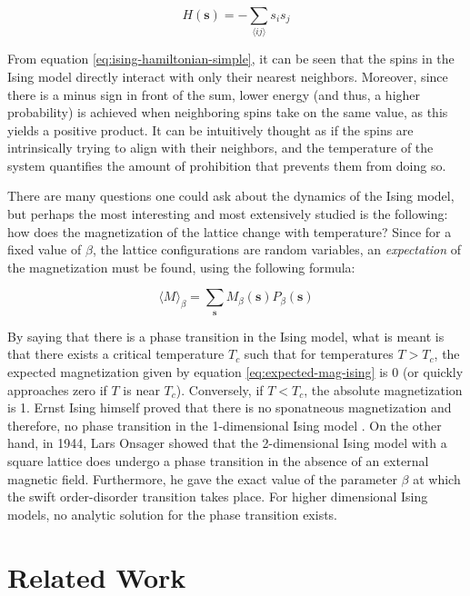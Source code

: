 \documentclass[12pt]{article}
\begin{document}
\begin{equation}
H(\boldsymbol{s}) = - \sum_{\langle ij \rangle} s_i s_j
\label{eq:ising-hamiltonian-simple}
\end{equation}

From equation \ref{eq:ising-hamiltonian-simple}, it can be seen that the spins in the Ising model directly interact with only their nearest neighbors. Moreover, since there is a minus sign in front of the sum, lower energy (and thus, a higher probability) is achieved when neighboring spins take on the same value, as this yields a positive product. It can be intuitively thought as if the spins are intrinsically trying to align with their neighbors, and the temperature of the system quantifies the amount of prohibition that prevents them from doing so. 

There are many questions one could ask about the dynamics of the Ising model, but perhaps the most interesting and most extensively studied is the following: how does the magnetization of the lattice change with temperature? Since for a fixed value of $\beta$, the lattice configurations are random variables, an \textit{expectation} of the magnetization must be found, using the following formula:

\begin{equation}
\langle M \rangle_\beta = \sum_{\boldsymbol{s}} M_\beta(\boldsymbol{s}) P_\beta(\boldsymbol{s})
\label{eq:expected-mag-ising}
\end{equation}

By saying that there is a phase transition in the Ising model, what is meant is that there exists a critical temperature $T_c$ such that for temperatures $T > T_c$, the expected magnetization given by equation \ref{eq:expected-mag-ising} is 0 (or quickly approaches zero if $T$ is near $T_c$). Conversely, if $T < T_c$, the absolute magnetization is 1. Ernst Ising himself proved that there is no sponatneous magnetization and therefore, no phase transition in the 1-dimensional Ising model \cite{Ising1925}. On the other hand, in 1944, Lars Onsager showed \cite{lars-onsanger} that the 2-dimensional Ising model with a square lattice does undergo a phase transition in the absence of an external magnetic field. Furthermore, he gave the exact value of the parameter $\beta$ at which the swift order-disorder transition takes place. For higher dimensional Ising models, no analytic solution for the phase transition exists. 

\newpage
\section{Related Work} 
\end{document}
